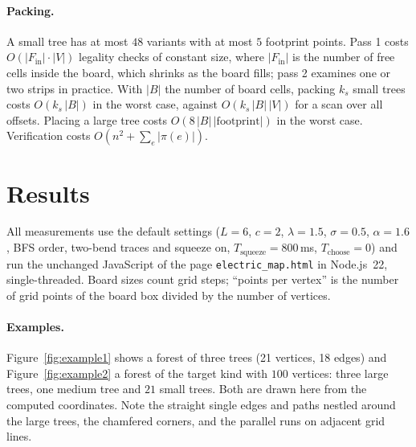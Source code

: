 \documentclass[11pt,a4paper]{article}
\theoremstyle{remark}
\begin{document}
\paragraph{Packing.} A small tree has at most $48$ variants with at most $5$ footprint points. Pass 1 costs
$O(|F_{\mathrm{in}}|\cdot|V|)$ legality checks of constant size, where $|F_{\mathrm{in}}|$ is the number of free cells
inside the board, which shrinks as the board fills; pass 2 examines one or two strips in practice. With
$|B|$ the number of board cells, packing $k_s$ small trees costs $O(k_s\,|B|)$ in the worst case, against
$O(k_s\,|B|\,|V|)$ for a scan over all offsets. Placing a large tree costs $O(8\,|B|\,|\text{footprint}|)$ in the
worst case. Verification costs $O(n^2+\sum_e|\pi(e)|)$.

\section{Results}\label{sec:experiments}

All measurements use the default settings ($L=6$, $c=2$, $\lambda=1.5$, $\sigma=0.5$, $\alpha=1.6$, BFS order,
two-bend traces and squeeze on, $T_{\mathrm{squeeze}}=800$\,ms, $T_{\mathrm{choose}}=0$) and run the unchanged
JavaScript of the page \texttt{electric\_map.html} in Node.js~22, single-threaded. Board sizes count grid steps; ``points per
vertex'' is the number of grid points of the board box divided by the number of vertices.

\paragraph{Examples.} Figure~\ref{fig:example1} shows a forest of three trees (21 vertices, 18 edges) and
Figure~\ref{fig:example2} a forest of the target kind with $100$ vertices: three large trees, one medium tree and $21$
small trees. Both are drawn here from the computed coordinates. Note the straight single edges and paths nestled
around the large trees, the chamfered corners, and the parallel runs on adjacent grid lines.
\end{document}
